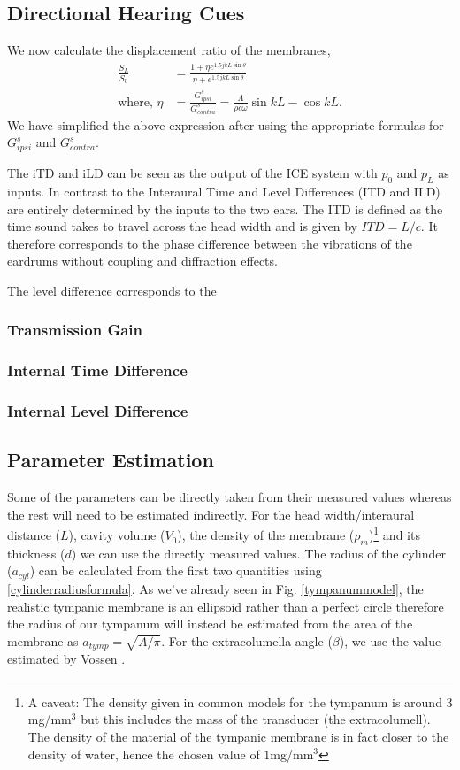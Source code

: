 \subsection{Directional Hearing Cues}\label{hearingcuessection}
We now calculate the displacement ratio of
the membranes,
\begin{align}
 \frac{S_L}{S_0}&=\frac{1+\eta e^{1.5jkL\sin\theta}}{\eta+e^{1.5jkL\sin\theta}}\\
 \mbox{where, }\eta&=\frac{G^s_{ipsi}}{G^s_{contra}}=\frac{\Lambda}{\rho c\omega}\sin kL-\cos kL.\nonumber
\end{align}
We have simplified the above expression after using the appropriate formulas for $G^s_{ipsi}$ and $G^s_{contra}$. 

The iTD and iLD can be seen as the output of the ICE system with $p_0$ and $p_L$ as inputs.
In contrast to the Interaural Time and Level Differences (ITD and ILD) are entirely determined 
by the inputs to the two ears. The ITD is defined as the time sound takes to travel across
the head width and is given by $ITD=L/c$. It therefore corresponds to the phase difference
between the vibrations of the eardrums without coupling and diffraction effects. 

The level difference corresponds to the 

\subsubsection{Transmission Gain}

\subsubsection{Internal Time Difference}

\subsubsection{Internal Level Difference}

\subsection{Parameter Estimation}\label{parameterestimation}
Some of the parameters can be directly taken from their measured values whereas
the rest will need to be estimated indirectly. 
For the head width/interaural distance ($L$), cavity volume ($V_0$), the density of the membrane ($\rho_m$)\footnote{A caveat: The density given in common models for the tympanum
is around $3$mg/mm$^3$ but this includes the mass of the transducer (the extracolumell). The density of the material of the tympanic membrane is in fact closer to the density of water,
hence the chosen value of $1$mg/mm$^3$} and its thickness ($d$)
we can use the directly measured values. The radius of the cylinder ($a_{cyl}$) can be calculated from the first two quantities
using \eqref{cylinderradiusformula}. 
As we've already seen in Fig. \ref{tympanummodel}, the realistic tympanic membrane is an ellipsoid rather than a perfect circle therefore the radius of our tympanum will
instead be estimated from the area of the membrane as $a_{tymp}=\sqrt{A/\pi}$. For the extracolumella angle ($\beta$), we use the value estimated by Vossen \cite{vossenjasa}.

